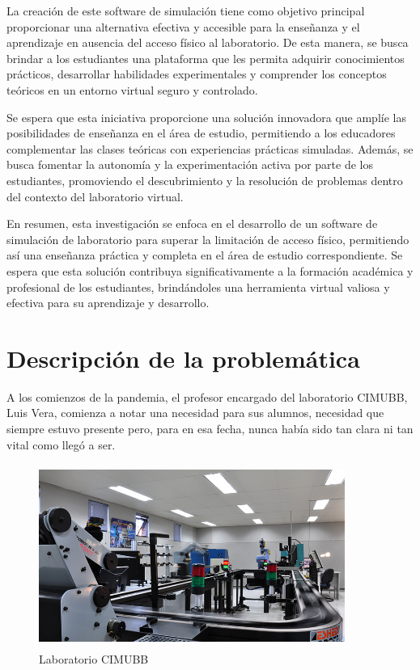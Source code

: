 La creación de este software de simulación tiene como objetivo principal proporcionar una alternativa efectiva y accesible para la enseñanza y el aprendizaje en ausencia del acceso físico al laboratorio. De esta manera, se busca brindar a los estudiantes una plataforma que les permita adquirir conocimientos prácticos, desarrollar habilidades experimentales y comprender los conceptos teóricos en un entorno virtual seguro y controlado.

Se espera que esta iniciativa proporcione una solución innovadora que amplíe las posibilidades de enseñanza en el área de estudio, permitiendo a los educadores complementar las clases teóricas con experiencias prácticas simuladas. Además, se busca fomentar la autonomía y la experimentación activa por parte de los estudiantes, promoviendo el descubrimiento y la resolución de problemas dentro del contexto del laboratorio virtual.

En resumen, esta investigación se enfoca en el desarrollo de un software de simulación de laboratorio para superar la limitación de acceso físico, permitiendo así una enseñanza práctica y completa en el área de estudio correspondiente. Se espera que esta solución contribuya significativamente a la formación académica y profesional de los estudiantes, brindándoles una herramienta virtual valiosa y efectiva para su aprendizaje y desarrollo.

\section{Descripción de la problemática}
A los comienzos de la pandemia, el profesor encargado del laboratorio CIMUBB, Luis Vera, comienza a notar una necesidad para sus alumnos, necesidad que siempre estuvo presente pero, para en esa fecha, nunca había sido tan clara ni tan vital como llegó a ser.

\clearpage

\begin{figure}[h]
\centering
\includegraphics[width=10cm, height=6cm]{figures/cimubb.jpg}
\caption{Laboratorio CIMUBB}
\label{fig:cimubb}
\end{figure}

